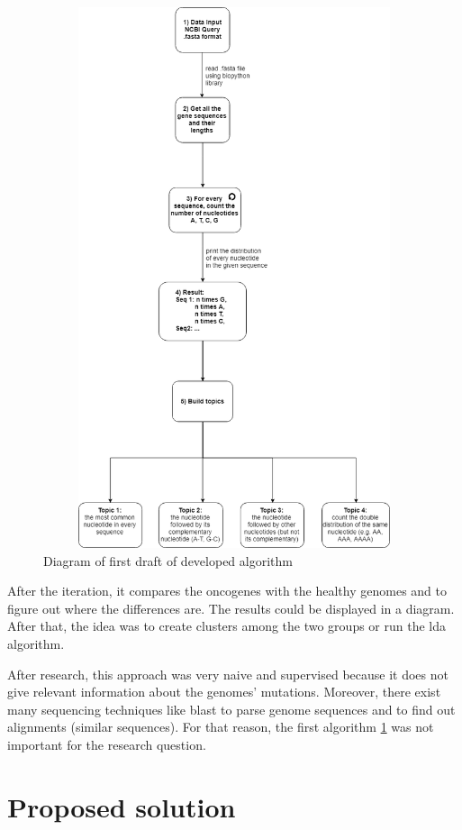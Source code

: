 \begin{figure}[htbp]
	\centering
	\includegraphics[width=1\textwidth, height=600px, keepaspectratio]{Image/creating_topics_algorithm.png}
	\caption{Diagram of first draft of developed algorithm}
	\label{first_draft_figure}
\end{figure}

After the iteration, it compares the oncogenes with the healthy genomes and to figure out where the differences are. The results could be displayed in a diagram. After that, the idea was to create clusters among the two groups or run the \gls{lda} algorithm.

After research, this approach was very naive and supervised because it does not give relevant information about the genomes' mutations. Moreover, there exist many sequencing techniques like \gls{blast} to parse genome sequences and to find out alignments (similar sequences).
For that reason, the first algorithm \ref{first_draft_figure} was not important for the research question.

\section{Proposed solution}\label{proposed_solution}

